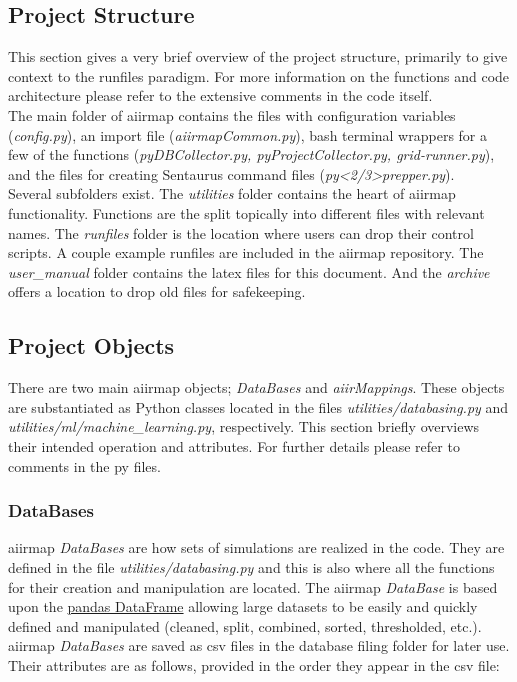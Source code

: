 \documentclass[a4paper,12pt,english]{article}
\begin{document}
    \subsection{Project Structure} \label{structure}
    This section gives a very brief overview of the project structure, primarily to give context to the runfiles paradigm. For more information on the functions and code architecture please refer to the extensive comments in the code itself. \\

    The main folder of aiirmap contains the files with configuration variables (\textit{config.py}), an import file (\textit{aiirmapCommon.py}), bash terminal wrappers for a few of the functions (\textit{pyDBCollector.py, pyProjectCollector.py, grid-runner.py}), and the files for creating Sentaurus command files (\textit{py<2/3>prepper.py}).\\

    Several subfolders exist. The \textit{utilities} folder contains the heart of aiirmap functionality. Functions are the  split topically into different files with relevant names. The \textit{runfiles} folder is the location where users can drop their control scripts. A couple example runfiles are included in the aiirmap repository. The \textit{user\_manual} folder contains the latex files for this document. And the \textit{archive} offers a location to drop old files for safekeeping.\\
    
    
    \subsection{Project Objects} \label{objects}
    There are two main aiirmap objects; \textit{DataBases} and \textit{aiirMappings}. These objects are substantiated as Python classes located in the files \textit{utilities/databasing.py} and \textit{utilities/ml/machine\_learning.py}, respectively. This section briefly overviews their intended operation and attributes. For further details please refer to comments in the py files.\\

    \subsubsection{DataBases}
    aiirmap \textit{DataBases} are how sets of simulations are realized in the code. They are defined in the file \textit{utilities/databasing.py} and this is also where all the functions for their creation and manipulation are located. The aiirmap \textit{DataBase} is based upon the \href{https://pandas.pydata.org/docs/reference/api/pandas.DataFrame.html}{pandas DataFrame} allowing large datasets to be easily and quickly defined and manipulated (cleaned, split, combined, sorted, thresholded, etc.). aiirmap \textit{DataBases} are saved as csv files in the database filing folder for later use. Their attributes are as follows, provided in the order they appear in the csv file:
    
\end{document}
